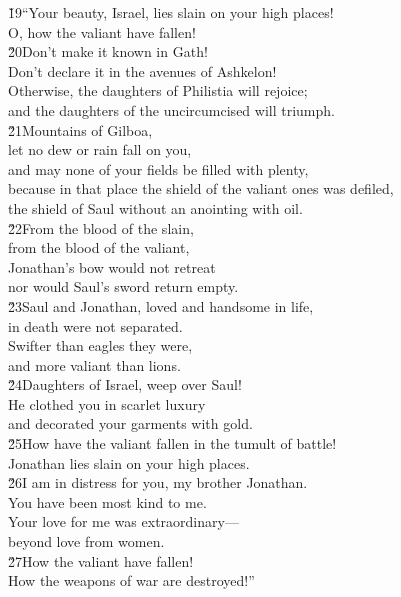 \begin{poetry}
\poeml \v{19}``Your beauty, Israel, lies slain on your high places! \\
\poemll    O, how the valiant have fallen! \\
\poeml \v{20}Don't make it known in Gath! \\
\poemll    Don't declare it in the avenues of Ashkelon! \\
\poeml Otherwise, the daughters of Philistia will rejoice; \\
\poemll    and the daughters of the uncircumcised will triumph. \\
\poeml \v{21}Mountains of Gilboa, \\
\poemll    let no dew or rain fall on you, \\
\poemlll       and may none of your fields be filled with plenty, \\
\poeml because in that place the shield of the valiant ones was defiled, \\
\poemll    the shield of Saul without an anointing with oil. \\
\poeml \v{22}From the blood of the slain, \\
\poemll    from the blood of the valiant, \\
\poeml Jonathan's bow would not retreat \\
\poemll    nor would Saul's sword return empty. \\
\poeml \v{23}Saul and Jonathan, loved and handsome in life, \\
\poemll    in death were not separated. \\
\poeml Swifter than eagles they were, \\
\poemll    and more valiant than lions. \\
\poeml \v{24}Daughters of Israel, weep over Saul! \\
\poemll    He clothed you in scarlet luxury \\
\poemlll       and decorated your garments with gold. \\
\poeml \v{25}How have the valiant fallen in the tumult of battle! \\
\poemll    Jonathan lies slain on your high places. \\
\poeml \v{26}I am in distress for you, my brother Jonathan. \\
\poemll    You have been most kind to me. \\
\poeml Your love for me was extraordinary--- \\
\poemll    beyond love from women. \\
\poeml \v{27}How the valiant have fallen! \\
\poemll    How the weapons of war are destroyed!''
\end{poetry}


